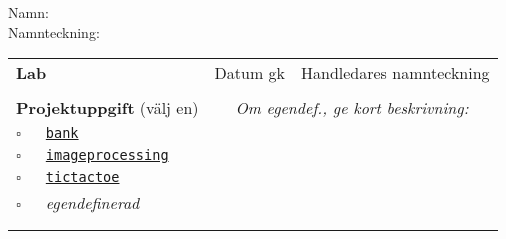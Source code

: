 \vspace{2.5em}\noindent Namn: \dotfill\\

\vspace{1em}\noindent Namnteckning: \dotfill\\

\newcommand{\LabRow}[1]{\\[-1.1em] \hyperref[section:lab:#1]{\texttt{#1}} & \dotfill &  \dotfill  \\ \addlinespace }

\begin{table}[h]
\centering
\vspace{1em}
\begin{tabular}{lcc}
\toprule \addlinespace 
{\sffamily\bfseries\small Lab} & {\sffamily\small Datum gk} &	{\sffamily\small Handledares namnteckning}\\ \addlinespace \midrule \\[-0.5em]

\addlinespace \midrule \addlinespace
{\sffamily\small {\bfseries Projektuppgift} (välj en)	} & 
\multicolumn{2}{c}{\textit{Om egendef., ge kort beskrivning:}}  \\ 
\addlinespace\addlinespace %
{\Large$\square$}\texttt{~~~\hyperref[section:proj:bank]{bank}}  &  &  \\
{\Large$\square$}\texttt{~~~\hyperref[section:proj:imageprocessing]{imageprocessing}}  \\
{\Large$\square$}\texttt{~~~\hyperref[section:proj:tictactoe]{tictactoe}} \\  
{\Large$\square$}\texttt{~~~}\textit{egendefinerad}  \\
\\
\\
\bottomrule
\end{tabular}
\end{table}